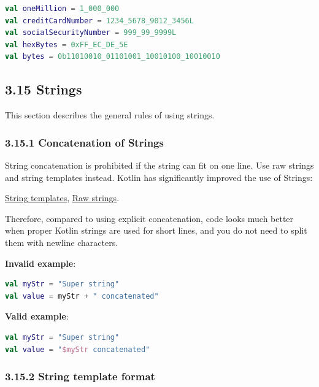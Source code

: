{{{{\begin{lstlisting}[language=Kotlin]
val oneMillion = 1_000_000
val creditCardNumber = 1234_5678_9012_3456L
val socialSecurityNumber = 999_99_9999L
val hexBytes = 0xFF_EC_DE_5E
val bytes = 0b11010010_01101001_10010100_10010010
\end{lstlisting}


\subsection*{\textbf{3.15 Strings}}

This section describes the general rules of using strings.



\subsubsection*{\textbf{3.15.1 Concatenation of Strings}}
\leavevmode\newline

String concatenation is prohibited if the string can fit on one line. Use raw strings and string templates instead. Kotlin has significantly improved the use of Strings: 

\href{https://kotlinlang.org/docs/reference/basic-types.html#string-templates}{String templates}, \href{https://kotlinlang.org/docs/reference/basic-types.html#string-literals}{Raw strings}.

Therefore, compared to using explicit concatenation, code looks much better when proper Kotlin strings are used for short lines, and you do not need to split them with newline characters.



\textbf{Invalid example}:

\begin{lstlisting}[language=Kotlin]
val myStr = "Super string"
val value = myStr + " concatenated"
\end{lstlisting}


\textbf{Valid example}:

\begin{lstlisting}[language=Kotlin]
val myStr = "Super string"
val value = "$myStr concatenated"
\end{lstlisting}


\subsubsection*{\textbf{3.15.2 String template format}}
\leavevmode\newline

}}}}

